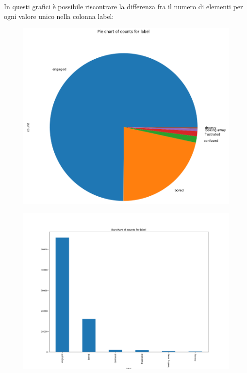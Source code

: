 In questi grafici è possibile riscontrare la differenza fra il numero di elementi per ogni valore unico nella colonna label:
\begin{figure}
    \begin{center}    
        \includegraphics[width=0.75\linewidth]{images/image43.png}
    \end{center}
\end{figure}
\begin{figure}
    \begin{center}    
        \includegraphics[width=0.75\linewidth]{images/image44.png}
    \end{center}
\end{figure}

